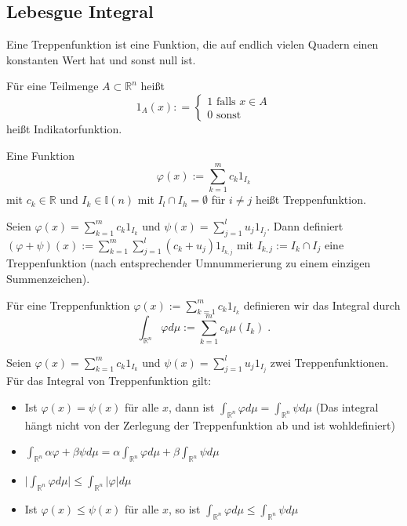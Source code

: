 \subsection{Lebesgue Integral}
 Eine Treppenfunktion ist eine Funktion, die auf endlich vielen Quadern einen konstanten Wert hat und sonst null ist. 

\begin{Definition}
Für eine Teilmenge $A \subset \mathbb{R}^n$ heißt
$$ 1_A (x): = \begin{cases} 1 \text{  falls }   x \in A  \\  0  \text{  sonst}  \end{cases}$$
heißt Indikatorfunktion.
\end{Definition}

\begin{Definition}
Eine Funktion 
$$ \varphi(x) := \sum_{k=1}^m c_k 1_{I_k}$$ mit $c_k \in \mathbb{R}$ und $I_k \in \mathbb{I}(n)$ mit $I_l \cap I_h = \emptyset$ für $i \neq j$
heißt Treppenfunktion.
\end{Definition}

\begin{Bemerkung}
Seien $\varphi(x) =   \sum_{k=1}^m  c_k 1_{I_k}$ und $\psi(x) =  \sum_{j=1}^l  u_j 1_{I_j}$. Dann definiert
$(\varphi + \psi)(x) := \sum_{k=1}^m \sum_{j=1}^l   (c_k + u_j) 1_{I_{k,j}}$ mit $I_{k,j}:= I_k \cap I_j$ eine Treppenfunktion (nach entsprechender Umnummerierung zu einem einzigen Summenzeichen).
\end{Bemerkung}


\begin{Definition}
Für eine Treppenfunktion $ \varphi(x) := \sum_{k=1}^m c_k 1_{I_k}$ definieren wir das Integral durch
$$\int_{\mathbb{R}^n} \varphi d\mu := \sum_{k =1}^m  c_k \mu(I_k) \; . $$
\end{Definition}

\begin{Satz}
Seien $\varphi(x) =   \sum_{k=1}^m  c_k 1_{I_k}$ und $\psi(x) =  \sum_{j=1}^l  u_j 1_{I_j}$ zwei Treppenfunktionen.
Für das Integral von Treppenfunktion gilt:
\begin{itemize}
\item Ist $\varphi(x) = \psi(x)$ für alle $x$, dann ist $\int_{\mathbb{R}^n} \varphi d\mu = \int_{\mathbb{R}^n} \psi d\mu$ (Das integral hängt nicht von der Zerlegung der Treppenfunktion ab und  ist wohldefiniert)
\item $\int_{\mathbb{R}^n} \alpha \varphi  + \beta \psi d\mu = \alpha \int_{\mathbb{R}^n}  \varphi d\mu + \beta  \int_{\mathbb{R}^n}  \psi d\mu$
\item $ \biggl|  \int_{\mathbb{R}^n} \varphi d\mu  \biggr| \leq \int_{\mathbb{R}^n} | \varphi | d\mu$
\item Ist $\varphi(x) \leq \psi(x)$ für alle $x$, so ist $\int_{\mathbb{R}^n} \varphi d\mu \leq \int_{\mathbb{R}^n} \psi d\mu$ 
\end{itemize}
\end{Satz}

